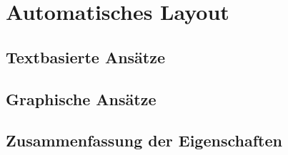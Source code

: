 
\section{Automatisches Layout}
\label{sec:automatic-layout}

 
\subsection{Textbasierte Ansätze}



\subsection{Graphische Ansätze}



\subsection{Zusammenfassung der Eigenschaften}



